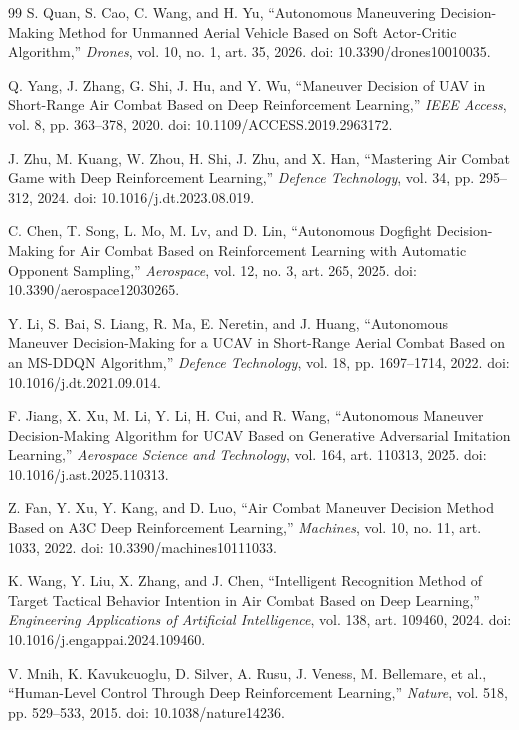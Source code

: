 \documentclass[5p,times]{elsarticle} %
\begin{document}
\begin{thebibliography}{99}
S. Quan, S. Cao, C. Wang, and H. Yu,
``Autonomous Maneuvering Decision-Making Method for Unmanned Aerial Vehicle Based on Soft Actor-Critic Algorithm,''
\emph{Drones}, vol. 10, no. 1, art. 35, 2026.
doi: 10.3390/drones10010035.

Q. Yang, J. Zhang, G. Shi, J. Hu, and Y. Wu,
``Maneuver Decision of UAV in Short-Range Air Combat Based on Deep Reinforcement Learning,''
\emph{IEEE Access}, vol. 8, pp. 363--378, 2020.
doi: 10.1109/ACCESS.2019.2963172.

J. Zhu, M. Kuang, W. Zhou, H. Shi, J. Zhu, and X. Han,
``Mastering Air Combat Game with Deep Reinforcement Learning,''
\emph{Defence Technology}, vol. 34, pp. 295--312, 2024.
doi: 10.1016/j.dt.2023.08.019.

C. Chen, T. Song, L. Mo, M. Lv, and D. Lin,
``Autonomous Dogfight Decision-Making for Air Combat Based on Reinforcement Learning with Automatic Opponent Sampling,''
\emph{Aerospace}, vol. 12, no. 3, art. 265, 2025.
doi: 10.3390/aerospace12030265.

Y. Li, S. Bai, S. Liang, R. Ma, E. Neretin, and J. Huang,
``Autonomous Maneuver Decision-Making for a UCAV in Short-Range Aerial Combat Based on an MS-DDQN Algorithm,''
\emph{Defence Technology}, vol. 18, pp. 1697--1714, 2022.
doi: 10.1016/j.dt.2021.09.014.

F. Jiang, X. Xu, M. Li, Y. Li, H. Cui, and R. Wang,
``Autonomous Maneuver Decision-Making Algorithm for UCAV Based on Generative Adversarial Imitation Learning,''
\emph{Aerospace Science and Technology}, vol. 164, art. 110313, 2025.
doi: 10.1016/j.ast.2025.110313.

Z. Fan, Y. Xu, Y. Kang, and D. Luo,
``Air Combat Maneuver Decision Method Based on A3C Deep Reinforcement Learning,''
\emph{Machines}, vol. 10, no. 11, art. 1033, 2022.
doi: 10.3390/machines10111033.

K. Wang, Y. Liu, X. Zhang, and J. Chen,
``Intelligent Recognition Method of Target Tactical Behavior Intention in Air Combat Based on Deep Learning,''
\emph{Engineering Applications of Artificial Intelligence}, vol. 138, art. 109460, 2024.
doi: 10.1016/j.engappai.2024.109460.

V. Mnih, K. Kavukcuoglu, D. Silver, A. Rusu, J. Veness, M. Bellemare, et al.,
``Human-Level Control Through Deep Reinforcement Learning,''
\emph{Nature}, vol. 518, pp. 529--533, 2015.
doi: 10.1038/nature14236.


\end{thebibliography}
\end{document}

